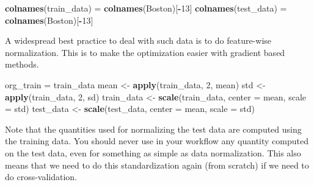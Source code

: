 \documentclass[10pt,ignorenonframetext,]{beamer}
\newenvironment{Shaded}{\begin{snugshade}}{\end{snugshade}}
\newcommand{\DataTypeTok}[1]{\textcolor[rgb]{0.13,0.29,0.53}{#1}}
\newcommand{\DecValTok}[1]{\textcolor[rgb]{0.00,0.00,0.81}{#1}}
\newcommand{\KeywordTok}[1]{\textcolor[rgb]{0.13,0.29,0.53}{\textbf{#1}}}
\newcommand{\NormalTok}[1]{#1}
\newcommand{\OperatorTok}[1]{\textcolor[rgb]{0.81,0.36,0.00}{\textbf{#1}}}
\newcommand{\StringTok}[1]{\textcolor[rgb]{0.31,0.60,0.02}{#1}}
\begin{document}
\begin{frame}[fragile]
\begin{Shaded}
\begin{Highlighting}[]
\KeywordTok{colnames}\NormalTok{(train_data) =}\StringTok{ }\KeywordTok{colnames}\NormalTok{(Boston)[}\OperatorTok{-}\DecValTok{13}\NormalTok{]}
\KeywordTok{colnames}\NormalTok{(test_data) =}\StringTok{ }\KeywordTok{colnames}\NormalTok{(Boston)[}\OperatorTok{-}\DecValTok{13}\NormalTok{]}
\end{Highlighting}
\end{Shaded}

\end{frame}

\begin{frame}[fragile]

A widespread best practice to deal with such data is to do feature-wise
normalization. This is to make the optimization easier with gradient
based methods.

\scriptsize

\begin{Shaded}
\begin{Highlighting}[]
\NormalTok{org_train =}\StringTok{ }\NormalTok{train_data}
\NormalTok{mean <-}\StringTok{ }\KeywordTok{apply}\NormalTok{(train_data, }\DecValTok{2}\NormalTok{, mean)}
\NormalTok{std <-}\StringTok{ }\KeywordTok{apply}\NormalTok{(train_data, }\DecValTok{2}\NormalTok{, sd)}
\NormalTok{train_data <-}\StringTok{ }\KeywordTok{scale}\NormalTok{(train_data, }\DataTypeTok{center =}\NormalTok{ mean, }\DataTypeTok{scale =}\NormalTok{ std)}
\NormalTok{test_data <-}\StringTok{ }\KeywordTok{scale}\NormalTok{(test_data, }\DataTypeTok{center =}\NormalTok{ mean, }\DataTypeTok{scale =}\NormalTok{ std)}
\end{Highlighting}
\end{Shaded}

\normalsize

Note that the quantities used for normalizing the test data are computed
using the training data. You should never use in your workflow any
quantity computed on the test data, even for something as simple as data
normalization. This also means that we need to do this standardization
again (from scratch) if we need to do cross-validation.

\end{frame}
\end{document}
